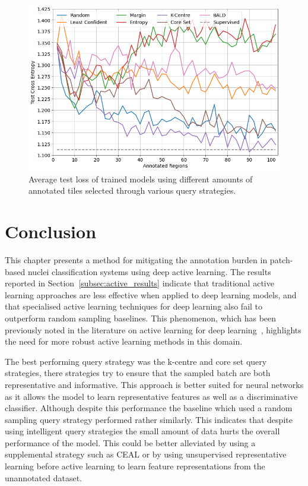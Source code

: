 \begin{figure}
	\centering
	\includegraphics[width=\textwidth]{images/active_learning_loss.png}
	\caption{Average test loss of trained models using different amounts of annotated tiles selected through various query strategies.}
	\label{fig:active_learning_loss}
\end{figure}



\section{Conclusion}
\label{sec:active_conclusion}
This chapter presents a method for mitigating the annotation burden in patch-based nuclei classification systems using deep active learning. The results reported in Section~\ref{subsec:active_results} indicate that traditional active learning approaches are less effective when applied to deep learning models, and that specialised active learning techniques for deep learning also fail to outperform random sampling baselines. This phenomenon, which has been previously noted in the literature on active learning for deep learning~\citep{ren2021survey}, highlights the need for more robust active learning methods in this domain.

The best performing query strategy was the k-centre and core set query strategies, there strategies try to ensure that the sampled batch are both representative and informative. This approach is better suited for neural networks as it allows the model to learn representative features as well as a discriminative classifier. Although despite this performance the baseline which used a random sampling query strategy performed rather similarly. This indicates that despite using intelligent query strategies the small amount of data hurts the overall performance of the model. This could be better alleviated by using a supplemental strategy such as CEAL or by using unsupervised representative learning before active learning to learn feature representations from the unannotated dataset.


